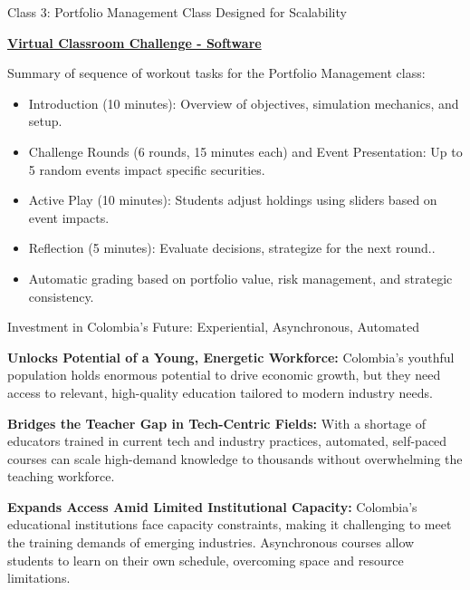 \documentclass[
  ignorenonframetext,
]{beamer}
\providecommand{\tightlist}{%
  \setlength{\itemsep}{0pt}\setlength{\parskip}{0pt}}
\begin{document}
\begin{frame}{Class 3: Portfolio Management Class Designed for
Scalability}
\label{class-3-portfolio-management-class-designed-for-scalability-2}
\small

\textbf{\href{https://jcwestland.shinyapps.io/virtual_invest_class/}{Virtual
Classroom Challenge - Software}}

Summary of sequence of workout tasks for the Portfolio Management class:

\begin{itemize}
\tightlist
\item
  Introduction (10 minutes): Overview of objectives, simulation
  mechanics, and setup.
\item
  Challenge Rounds (6 rounds, 15 minutes each) and Event Presentation:
  Up to 5 random events impact specific securities.
\item
  Active Play (10 minutes): Students adjust holdings using sliders based
  on event impacts.
\item
  Reflection (5 minutes): Evaluate decisions, strategize for the next
  round..
\item
  Automatic grading based on portfolio value, risk management, and
  strategic consistency.
\end{itemize}
\end{frame}

\begin{frame}{Investment in Colombia's Future: Experiential,
Asynchronous, Automated}
\label{investment-in-colombias-future-experiential-asynchronous-automated}
\small

\textbf{Unlocks Potential of a Young, Energetic Workforce:} Colombia's
youthful population holds enormous potential to drive economic growth,
but they need access to relevant, high-quality education tailored to
modern industry needs.

\textbf{Bridges the Teacher Gap in Tech-Centric Fields:} With a shortage
of educators trained in current tech and industry practices, automated,
self-paced courses can scale high-demand knowledge to thousands without
overwhelming the teaching workforce.

\textbf{Expands Access Amid Limited Institutional Capacity:} Colombia's
educational institutions face capacity constraints, making it
challenging to meet the training demands of emerging industries.
Asynchronous courses allow students to learn on their own schedule,
overcoming space and resource limitations.
\end{frame}
\end{document}
